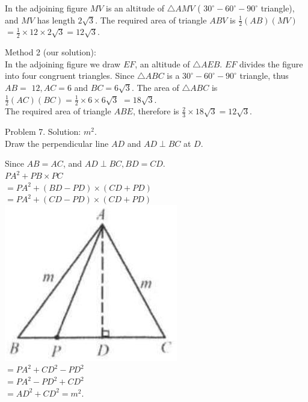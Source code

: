 \documentclass[10pt]{article}
\begin{document}
In the adjoining figure \(M V\) is an altitude of \(\triangle A M V\) ( \(30^{\circ}-60^{\circ}-90^{\circ}\) triangle), and \(M V\) has length \(2 \sqrt{3}\). The required area of triangle \(A B V\) is \(\frac{1}{2}(A B)(M V)\)\\
\(=\frac{1}{2} \times 12 \times 2 \sqrt{3}=12 \sqrt{3}\).

Method 2 (our solution):\\
In the adjoining figure we draw \(E F\), an altitude of \(\triangle A E B\). \(E F\) divides the figure into four congruent triangles. Since \(\triangle A B C\) is a \(30^{\circ}-60^{\circ}-90^{\circ}\) triangle, thus \(A B=\) \(12, A C=6\) and \(B C=6 \sqrt{3}\). The area of \(\triangle A B C\) is \(\frac{1}{2}(A C)(B C)=\frac{1}{2} \times 6 \times 6 \sqrt{3}\) \(=18 \sqrt{3}\).\\
The required area of triangle \(A B E\), therefore is \(\frac{2}{3} \times 18 \sqrt{3}=12 \sqrt{3}\).

Problem 7. Solution: \(m^{2}\).\\
Draw the perpendicular line \(A D\) and \(A D \perp B C\) at \(D\).

Since \(A B=A C\), and \(A D \perp B C, B D=C D\).\\
\(P A^{2}+P B \times P C\)\\
\(=P A^{2}+(B D-P D) \times(C D+P D)\)\\
\(=P A^{2}+(C D-P D) \times(C D+P D)\)\\
\includegraphics[max width=\textwidth, center]{2025_04_17_97bc1f7e44d93c271a88g-094}\\
\(=P A^{2}+C D^{2}-P D^{2}\)\\
\(=P A^{2}-P D^{2}+C D^{2}\)\\
\(=A D^{2}+C D^{2}=m^{2}\).
\end{document}
